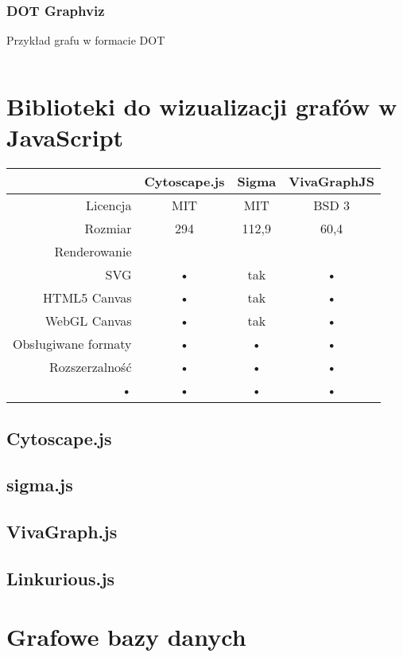 \subsubsection{DOT Graphviz} 
\begin{listing}[H]
    \caption{Przykład grafu w formacie DOT}
    \inputminted{text}{example.gv}
    \label{lst:dot-example}
\end{listing}

\section{Biblioteki do wizualizacji grafów w JavaScript}

\begin{tabularx}{\textwidth}{|r|c|c|c}
\hline 
 & Cytoscape.js & Sigma & VivaGraphJS \\ 
\hline 
Licencja & MIT & MIT & BSD 3 \\ 
\hline 
Rozmiar & 294 & 112,9 & 60,4 \\ 
\hline 
Renderowanie & & & \\
SVG & • & tak & • \\
HTML5 Canvas & • & tak & • \\
WebGL Canvas & • & tak & • \\ 
\hline 
Obsługiwane formaty & • & • & • \\ 
\hline
Rozszerzalność & • & • & • \\ 
\hline 
• & • & • & • \\ 
\hline 
\end{tabularx} 
\subsection{Cytoscape.js}
\subsection{sigma.js}
\subsection{VivaGraph.js}
\subsection{Linkurious.js}
\section{Grafowe bazy danych}
